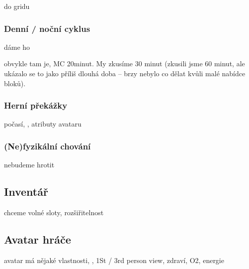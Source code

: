 do gridu

\subsubsection{Denní / noční cyklus}
dáme ho

obvykle tam je, MC 20minut. My zkusíme 30 minut (zkusili jsme 60 minut, ale ukázalo se to jako příliš dlouhá doba -- brzy nebylo co dělat kvůli malé nabídce bloků).



\subsubsection{Herní překážky}

počasí, , atributy avataru

\subsubsection{(Ne)fyzikální chování}

nebudeme hrotit

\subsection{Inventář}

chceme volné sloty, rozšiřitelnost

\subsection{Avatar hráče}
avatar má nějaké vlastnosti, \HUD{}, 1St / 3rd person view, zdraví, O2, energie



